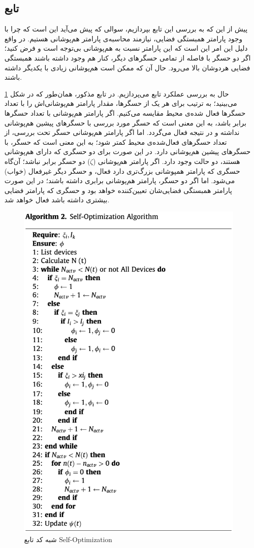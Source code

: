 \subsection{تابع }
پیش از این که به بررسی این تابع بپردازیم، سوالی که پیش می‌آید این است که چرا با وجود پارامتر همبستگی فضایی، نیازمند محاسبه‌ی پارامتر هم‌پوشانی هستیم. در واقع دلیل این امر این است که این پارامتر نسبت به هم‌پوشانی بی‌توجه است و فرض کنید؛ اگر دو حسگر با فاصله از تمامی حسگر‌های دیگر، کنار هم وجود داشته باشند همبستگی فضایی هردوشان بالا می‌رود. حال آن که ممکن است هم‌پوشانی زیادی با یکدیگر داشته باشند.

\par
حال به بررسی عملکرد تابع  می‌پردازیم. در تابع مذکور، همان‌طور که در شکل \ref{fig:sot-al2} می‌بینید؛ به ترتیب برای هر یک از حسگرها، مقدار پارامتر هم‌پوشانی‌اش را با تعداد حسگرها فعال شده‌ی محیط مقایسه می‌کنیم. اگر پارامتر هم‌پوشانی با تعداد حسگرها برابر باشد، به این معنی است که حسگر مورد بررسی با حسگرهای پیشین هم‌پوشانی نداشته و در نتیجه فعال می‌گردد. اما اگر پارامتر هم‌پوشانی حسگر تحت بررسی، از تعداد حسگرهای فعال‌شده‌ی محیط کمتر شود؛ به این معنی است که حسگر، با حسگرهای پیشین هم‌پوشانی دارد. در این صورت برای دو حسگری که دارای هم‌پوشانی هستند، دو حالت وجود دارد. اگر پارامتر هم‌پوشانی ($\zeta$) دو حسگر برابر نباشد؛ آن‌گاه حسگری که پارامتر همپوشانی بزرگ‌تری دارد فعال، و حسگر دیگر غیرفعال (خواب) می‌شود. اما اگر دو حسگر، پارامتر هم‌پوشانی برابری داشته باشند؛ در این صورت پارامتر همبستگی فضایی‌شان تعیین‌کننده خواهد بود و حسگری که پارامتر فضایی بیشتری داشته باشد فعال خواهد شد.

\begin{figure}
	\centering
	\includegraphics[width=0.7\linewidth]{figs/sot-al2}
	\caption {شبه کد تابع Self-Optimization}
	\label{fig:sot-al2}
\end{figure}

